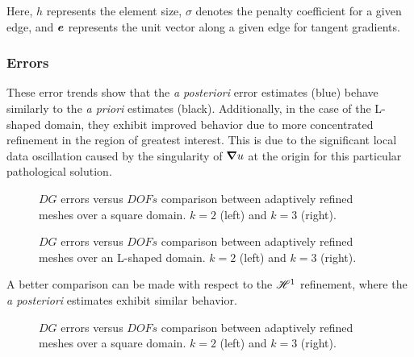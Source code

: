 Here, $h$ represents the element size, $\sigma$ denotes the penalty coefficient for a given edge, and $\bm{e}$ represents the unit vector along a given edge for tangent gradients.

\newpage
\subsubsection{Errors}

These error trends show that the \textit{a posteriori} error estimates (blue) behave similarly to the \textit{a priori} estimates (black). Additionally, in the case of the L-shaped domain, they exhibit improved behavior due to more concentrated refinement in the region of greatest interest. This is due to the significant local data oscillation caused by the singularity of $\bm{\nabla} u$ at the origin for this particular pathological solution.

\begin{figure}[!ht]
	\begin{subfigure}[b]{0.45\textwidth}
		
	\end{subfigure}
	\hfill
	\begin{subfigure}[b]{0.45\textwidth}
		
	\end{subfigure}
    \caption{$DG$ errors versus $DOFs$ comparison between adaptively refined meshes over a square domain. $k = 2$ (left) and $k = 3$ (right).}
\end{figure}

\begin{figure}[!ht]
	\begin{subfigure}[b]{0.45\textwidth}
		
	\end{subfigure}
	\hfill
	\begin{subfigure}[b]{0.45\textwidth}
	\end{subfigure}
    \caption{$DG$ errors versus $DOFs$ comparison between adaptively refined meshes over an L-shaped domain. $k = 2$ (left) and $k = 3$ (right).}
\end{figure}

\newpage

A better comparison can be made with respect to the $\mathscr{H}^1$ refinement, where the \textit{a posteriori} estimates exhibit similar behavior.

\begin{figure}[!ht]
	\begin{subfigure}[b]{0.45\textwidth}
		
	\end{subfigure}
	\hfill
	\begin{subfigure}[b]{0.45\textwidth}
		
	\end{subfigure}
    \caption{$DG$ errors versus $DOFs$ comparison between adaptively refined meshes over a square domain. $k = 2$ (left) and $k = 3$ (right).}
\end{figure}

